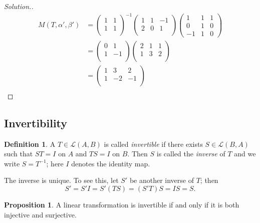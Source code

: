 \documentclass[11pt,a4paper]{article}
\theoremstyle{definition}
\newtheorem{defn}[thm]{Definition}
\newtheorem{prop}[thm]{Proposition}
\newenvironment{solution}
  {\renewcommand{\qedsymbol}{}\begin{proof}[\textit{Solution}.]}
  {\end{proof}}
\begin{document}
\begin{solution}
\begin{align*}
M(T,\alpha',\beta') &=
\begin{pmatrix}
1&1\\1&1\\
\end{pmatrix}^{-1}
\begin{pmatrix}
1&1&-1\\2&0&1\\
\end{pmatrix}
\begin{pmatrix}
1&1&1\\0&1&0\\-1&1&0
\end{pmatrix}\\
&=
\begin{pmatrix}
0&1\\1&-1\\
\end{pmatrix}
\begin{pmatrix}
2&1&1\\1&3&2\\
\end{pmatrix}\\
&=\begin{pmatrix}
1&3&2\\1&-2&-1\\
\end{pmatrix}\\
\end{align*}
\end{solution}


\subsection{Invertibility}
\begin{defn}
A $T\in \mathcal{L}(A,B)$ is called \emph{invertible} if there exists
$S\in \mathcal{L}(B,A)$ such that $ST=I$ on $A$ and $TS=I$ on $B$. Then $S$ is
called the \emph{inverse} of $T$ and we write $S=T^{-1}$; here $I$ denotes the
identity map.
\end{defn}
The inverse is unique. To see this, let $S'$ be another inverse of $T$; then
$$S'=S'I=S'(TS)=(S'T)S=IS=S.$$


\begin{prop}\label{prop:invertible-bijective}
A linear transformation is invertible if and only if it is both injective and
surjective.
\end{prop}
\end{document}
